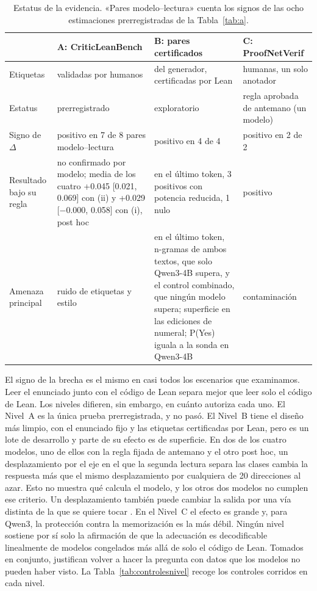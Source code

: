 \documentclass[10pt]{article}
\newcommand{\D}{\Delta}
\begin{document}
\begin{table}[h]
\centering
\caption{Estatus de la evidencia. «Pares modelo--lectura» cuenta los signos de las ocho estimaciones prerregistradas de la Tabla~\ref{tab:a}.}
\label{tab:conjunta}
\vspace{2pt}
\begin{tabularx}{\linewidth}{@{}lXXX@{}}
\toprule
 & A: CriticLeanBench & B: pares certificados & C: ProofNetVerif\\
\midrule
Etiquetas & validadas por humanos & del generador, certificadas por Lean & humanas, un solo anotador\\
Estatus & prerregistrado & exploratorio & regla aprobada de antemano (un modelo)\\
Signo de $\D$ & positivo en 7 de 8 pares modelo--lectura & positivo en 4 de 4 & positivo en 2 de 2\\
Resultado bajo su regla & no confirmado por modelo; media de los cuatro +0.045 [0.021, 0.069] con (ii) y +0.029 [−0.000, 0.058] con (i), post hoc & en el último token, 3 positivos con potencia reducida, 1 nulo & positivo\\
Amenaza principal & ruido de etiquetas y estilo & en el último token, n-gramas de ambos textos, que solo Qwen3-4B supera, y el control combinado, que ningún modelo supera; superficie en las ediciones de numeral; P(Yes) iguala a la sonda en Qwen3-4B & contaminación\\
\bottomrule
\end{tabularx}
\end{table}

El signo de la brecha es el mismo en casi todos los escenarios que examinamos. Leer el enunciado junto con el código de Lean
separa mejor que leer solo el código de Lean. Los niveles difieren, sin embargo, en cuánto autoriza cada uno. El Nivel~A es
la única prueba prerregistrada, y no pasó. El Nivel~B tiene el diseño más limpio, con el enunciado fijo y las
etiquetas certificadas por Lean, pero es un lote de desarrollo y parte de su efecto es de superficie.
En dos de los cuatro modelos, uno de ellos con la regla fijada de antemano y el otro post hoc, un desplazamiento por el eje en el que la
segunda lectura separa las clases cambia la respuesta más que el mismo desplazamiento por cualquiera de 20 direcciones al azar. Esto no muestra qué calcula el modelo, y los otros dos modelos no cumplen ese criterio. Un desplazamiento también puede cambiar la salida
por una vía distinta de la que se quiere tocar \citep{makelov2024subspace}. En el Nivel~C
el efecto es grande y, para Qwen3, la protección contra la memorización es la más débil. Ningún nivel sostiene por
sí solo la afirmación de que la adecuación es decodificable linealmente de modelos congelados más allá de solo el código de Lean. Tomados en conjunto, justifican volver a hacer la pregunta con datos que los modelos no pueden haber visto.
La Tabla~\ref{tab:controlesnivel} recoge los controles corridos en cada nivel.
\end{document}
